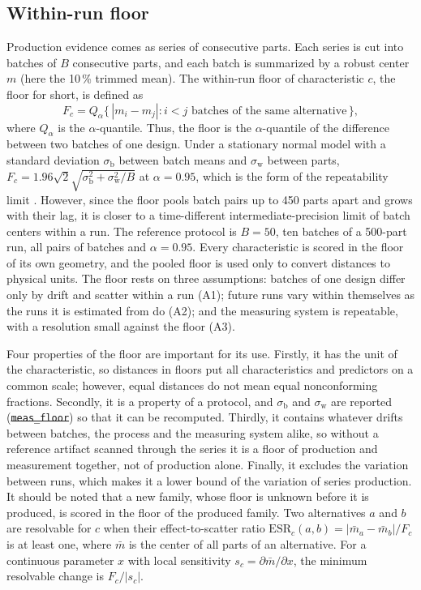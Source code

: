 \documentclass[pdflatex,sn-basic,lineno]{sn-jnl}
\newcommand{\res}[1]{\texttt{#1}}  %
\providecommand{\DIFadd}[1]{{\protect\color{blue}\uwave{#1}}} %
\providecommand{\DIFdel}[1]{{\protect\color{red}\sout{#1}}}                      %
\providecommand{\DIFaddbegin}{} %
\providecommand{\DIFaddend}{} %
\providecommand{\DIFdelbegin}{} %
\providecommand{\DIFdelend}{} %
\newcommand{\DIFscaledelfig}{0.5}
\newlength{\DIFdelgraphicswidth} %
\newlength{\DIFdelgraphicsheight} %
\newcommand{\DIFaddincludegraphics}[2][]{{\color{blue}\fbox{\DIFOincludegraphics[#1]{#2}}}} %
\newcommand{\DIFdelincludegraphics}[2][]{%
\sbox{\DIFdelgraphicsbox}{\DIFOincludegraphics[#1]{#2}}%
\settoboxwidth{\DIFdelgraphicswidth}{\DIFdelgraphicsbox} %
\settoboxtotalheight{\DIFdelgraphicsheight}{\DIFdelgraphicsbox} %
\scalebox{\DIFscaledelfig}{%
\parbox[b]{\DIFdelgraphicswidth}{\usebox{\DIFdelgraphicsbox}\\[-\baselineskip] \rule{\DIFdelgraphicswidth}{0em}}\llap{\resizebox{\DIFdelgraphicswidth}{\DIFdelgraphicsheight}{%
\setlength{\unitlength}{\DIFdelgraphicswidth}%
\begin{picture}(1,1)%
\thicklines\linethickness{2pt} %
{\color[rgb]{1,0,0}\put(0,0){\framebox(1,1){}}}%
{\color[rgb]{1,0,0}\put(0,0){\line( 1,1){1}}}%
{\color[rgb]{1,0,0}\put(0,1){\line(1,-1){1}}}%
\end{picture}%
}\hspace*{3pt}}} %
} %
\DeclareRobustCommand{\DIFaddbegin}{\DIFOaddbegin \let\includegraphics\DIFaddincludegraphics} %
\DeclareRobustCommand{\DIFaddend}{\DIFOaddend \let\includegraphics\DIFOincludegraphics} %
\DeclareRobustCommand{\DIFdelbegin}{\DIFOdelbegin \let\includegraphics\DIFdelincludegraphics} %
\DeclareRobustCommand{\DIFdelend}{\DIFOaddend \let\includegraphics\DIFOincludegraphics} %
\begin{document}
\subsection{Within-run floor}\label{sec:floor}

Production evidence comes as series of consecutive parts. Each series is cut into batches of $B$ consecutive parts, and each batch is summarized by a robust center $m$ (here the 10\,\% trimmed mean). The within-run floor of characteristic $c$, the floor for short, is defined as
\begin{equation}
F_c = Q_\alpha\bigl\{\,|m_i - m_j| : i< j \text{ batches of the same alternative}\,\bigr\},
\label{eq:floor}
\end{equation}
where $Q_\alpha$ is the $\alpha$-quantile. Thus, the floor is the $\alpha$-quantile of the difference between two batches of one design. Under a stationary normal model with a standard deviation $\sigma_\mathrm{b}$ between batch means and $\sigma_\mathrm{w}$ between parts, $F_c = 1.96\sqrt{2}\sqrt{\sigma_\mathrm{b}^2+\sigma_\mathrm{w}^2/B}$ at $\alpha=0.95$, which is the form of the repeatability limit \citep{iso2025repeatability, iso1994accuracy}. However, since the floor pools batch pairs up to 450 parts apart and grows with their lag, it is closer to a time-different intermediate-precision limit \citep{iso2023intermediate} of batch centers within a run. The reference protocol is $B=50$, ten batches of a 500-part run, all pairs of batches and $\alpha=0.95$. Every characteristic is scored in the floor of its own geometry, and the pooled floor is used only to convert distances to physical units. The floor rests on three assumptions: batches of one design differ only by drift and scatter within a run (A1); future runs vary within themselves as the runs it is estimated from do (A2); and the measuring system is repeatable, with a resolution small against the floor (A3).

Four properties of the floor are important for its use. Firstly, it has the unit of the characteristic, so distances in floors put all characteristics and predictors on a common scale; however, equal distances do not mean equal nonconforming fractions. Secondly, it is a property of a protocol, and $\sigma_\mathrm{b}$ and $\sigma_\mathrm{w}$ are reported (\DIFdelbegin \DIFdel{\res{meas\_floor}}\DIFdelend \DIFaddbegin \DIFadd{\res{panel\_floor\_protocol}}\DIFaddend ) so that it can be recomputed. Thirdly, it contains whatever drifts between batches, the process and the measuring system alike, so without a reference artifact scanned through the series it is a floor of production and measurement together, not of production alone. Finally, it excludes the variation between runs, which makes it a lower bound of the variation of series production. It should be noted that a new family, whose floor is unknown before it is produced, is scored in the floor of the produced family. Two alternatives $a$ and $b$ are resolvable for $c$ when their effect-to-scatter ratio $\mathrm{ESR}_c(a,b) = |\bar m_a - \bar m_b|/F_c$ is at least one, where $\bar m$ is the center of all parts of an alternative. For a continuous parameter $x$ with local sensitivity $s_c=\partial\bar m/\partial x$, the minimum resolvable change is $F_c/|s_c|$.
\end{document}
